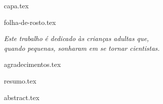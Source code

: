 \documentclass[
	12pt,				%
	openright,			%
	oneside,			%
	a4paper,			%
	brazil,  			%
	french,				%
	spanish,			%
	english				%
	]{abntex2}
\begin{document}

\frenchspacing 



{capa.tex}
\imprimircapa


{folha-de-rosto.tex}
\imprimirfolhaderosto*

%
%
\begin{fichacatalografica}
    
\end{fichacatalografica}

%
%
\begin{folhadeaprovacao}
    
\end{folhadeaprovacao}

%
%
\begin{dedicatoria}
   \vspace*{\fill}
   \centering
   \noindent
   \textit{ Este trabalho é dedicado às crianças adultas que,\\
   quando pequenas, sonharam em se tornar cientistas.} \vspace*{\fill}
\end{dedicatoria}

%
%
\begin{agradecimentos}
    {agradecimentos.tex}
\end{agradecimentos}


\setlength{\absparsep}{18pt} %
{resumo.tex}

{abstract.tex}
\end{document}
